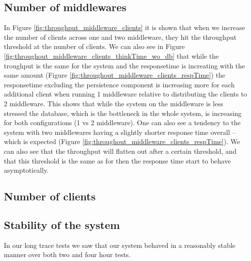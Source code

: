 \documentclass{article}
\begin{document}
        \subsection{Number of middlewares}
		   In Figure \ref{fig:throughput_middleware_clients} it is shown that when we increase the number of clients across one and two middleware, they hit the throughput threshold at the number of clients. We can also see in Figure \ref{fig:throughout_middleware_clients_thinkTime_wo_db} that while the troughput is the same for the system and the responsetime is increating with the same amount (Figure \ref{fig:throughout_middleware_clients_respTime}) the responsetime excluding the persistence component is increasing more for each additional client when running 1 middleware relative to distributing the clients to 2 middleware. This shows that while the system on the middleware is less stressed the database, which is the bottleneck in the whole system, is increasing for both configurations (1 vs 2 middleware). One can also see a tendency to the system with two middlewares having a slightly shorter response time overall -- which is expected (Figure \ref{fig:throughout_middleware_clients_respTime}). We can also see that the throughput will flatten out after a certain threshold, and that this threshold is the same as for then the response time start to behave asymptotically.

        \subsection{Number of clients}


        \subsection{Stability of the system}
            In our long trace tests we saw that our system behaved in a reasonably stable manner over both two and four hour tests.
\end{document}
